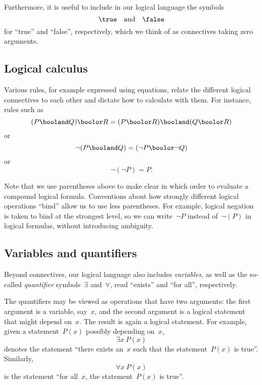 Furthermore, it is useful to include in our logical language the symbols
\begin{equation}
    \true \quad \text{and}  \quad \false
\end{equation}
for ``true'' and ``false'', respectively, which we think of as connectives taking zero arguments.

\subsection{Logical calculus}

Various rules, for example expressed using equations, relate the different logical connectives to each other and dictate how to calculate with them.
For instance, rules such as
\begin{equation}
    (P \booland Q)
    \boolor R = (P \boolor R) \booland (Q \boolor R)
\end{equation}
or
\begin{equation}
    \lnot (P \booland Q)  = (\lnot P \boolor \lnot Q)
\end{equation}
or
\begin{equation}
    \lnot (\lnot P) = P.
\end{equation}

Note that we use parentheses above to make clear in which order to evaluate a compound logical formula.
Conventions about how strongly different logical operations ``bind'' allow us to use less parentheses.
For example, logical negation is taken to bind at the strongest level, so we can write~$\lnot P$ instead of~$\lnot (P)$ in logical formulas, without introducing ambiguity.

\subsection{Variables and quantifiers}

Beyond connectives, our logical language also includes \emph{variables}, as well as the so-called \emph{quantifier} symbols~$\exists$ and~$\forall$, read ``exists'' and ``for all'', respectively.

The quantifiers may be viewed as operations that have two arguments:
the first argument is a variable, say~$x$, and the second argument is a logical statement that might depend on~$x$.
The result is again a logical statement.
For example, given a statement~$P(x)$ possibly depending on~$x$,
\begin{equation}
    \exists x \ P(x)
\end{equation}
denotes the statement ``there exists an~$x$ such that the statement~$P(x)$ is true''.
Similarly,
\begin{equation}
    \forall x \ P(x)
\end{equation}
is the statement ``for all~$x$, the statement~$P(x)$ is true''.

